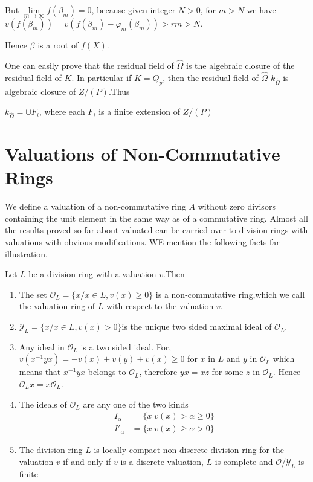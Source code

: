 But $\lim\limits_{m \to \infty} f(\beta_m)=0$, because given integer
$N>0$, for $m>N$ we have $v(f(\beta_m))=v(f(\beta_m)-\varphi_m
(\beta_m))> rm >N$. 

Hence $\beta$ is a root of $f(X)$.

One can easily prove that the residual field of $\hat{\Omega}$ is the
algebraic closure of the residual field of $K$. In particular if $K =
Q_p$, then the residual field of $\hat\Omega$ \iec  $k_{\hat{\Omega}}$
is algebraic closure of $Z/(P)$.Thus 

$k_{\hat{\Omega}} =\cup F_i$, where each $F_i$ is a finite extension of $Z/(P)$

\section{Valuations of Non-Commutative Rings}\label{part1:chap2:sec8}

We define a valuation of a non-commutative ring $A$ without zero
divisors containing the unit element in the same way as of a
commutative ring. Almost all the results proved so far about valuated
can be carried over to division rings with valuations with obvious
modifications. WE mention the following facts far illustration. 

Let $L$ be a division ring with a valuation $v$.Then
\begin{enumerate}[(1)]
\item The set $\mathscr{O}_L = \bigg\{ x/x \in L,v(x) \ge 0 \bigg \}$
  is a non-commutative ring,which we call the valuation ring of $L$
  with respect to the valuation $v$. 
\item $\mathscr{Y}_L =\bigg\{ x/x \in L,v(x) > 0 \bigg \}$\pageoriginale is the
  unique two sided maximal ideal of $\mathscr{O}_L$. 
\item Any ideal in $\mathscr{O}_L$ is a two sided ideal. For, $v
  (x^{-1} y x)= -v(x)+v(y)+v(x)\ge 0$ for $x$ in $L$ and $y$ in
  $\mathscr{O}_L$ which means that $x^{-1} y x $ belongs to
  $\mathscr{O}_L$, therefore $yx=xz$ for some $z$ in
  $\mathscr{O}_L$. Hence $\mathscr{O}_L x = x \mathscr{O}_L$. 
\item The ideals of $\mathscr{O}_L$ are any one of the two kinds
  \begin{align*}
    I_\alpha & = \bigg\{ x|v(x)>\alpha \ge 0 \bigg\}\\
    I'_\alpha & = \bigg\{ x|v(x) \ge \alpha > 0 \bigg\}
  \end{align*}
\item The division ring $L$ is locally compact non-discrete division
  ring for the valuation $v$ if and only if $v$ is a discrete
  valuation, $L$ is complete and $ \mathscr{O} /\mathscr{Y}_L$ is
  finite 
\end{enumerate}

